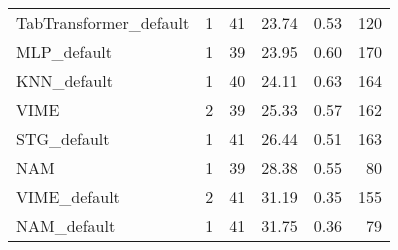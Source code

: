 \begin{tabular}{lrrrrr}
TabTransformer_default     &                  1 &  41 &  23.74 &                           0.53 &   120 \\
MLP_default                &                  1 &  39 &  23.95 &                           0.60 &   170 \\
KNN_default                &                  1 &  40 &  24.11 &                           0.63 &   164 \\
VIME                       &                  2 &  39 &  25.33 &                           0.57 &   162 \\
STG_default                &                  1 &  41 &  26.44 &                           0.51 &   163 \\
NAM                        &                  1 &  39 &  28.38 &                           0.55 &    80 \\
VIME_default               &                  2 &  41 &  31.19 &                           0.35 &   155 \\
NAM_default                &                  1 &  41 &  31.75 &                           0.36 &    79 \\
\bottomrule
\end{tabular}
